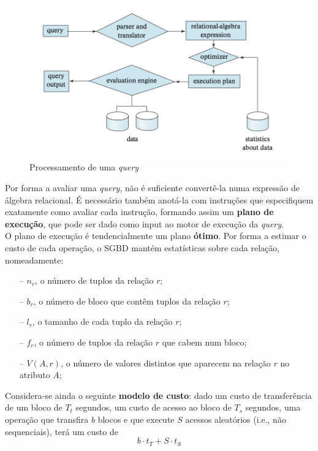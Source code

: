 \documentclass[oneside]{book}
\theoremstyle{definition}
\begin{document}
\begin{figure}[H]
    \centering
    \includegraphics[scale = 0.5]{cap1/arquitetura.png}
    \caption{Processamento de uma \textit{query}}
\end{figure}

Por forma a avaliar uma \textit{query}, não é suficiente convertê-la numa expressão de álgebra relacional. É necessário também anotá-la com instruções que especifiquem exatamente como avaliar cada instrução, formando assim um \textbf{plano de execução}, que pode ser dado como input ao motor de execução da \textit{query}.\\
O plano de execução é tendencialmente um plano \textbf{ótimo}. Por forma a estimar o custo de cada operação, o SGBD mantém estatísticas sobre cada relação, nomeadamente:

\begin{itemize}
    \itemsep0cm
    \item[--] $n_r$, o número de tuplos da relação $r$;
    \item[--] $b_r$, o número de bloco que contêm tuplos da relação $r$;
    \item[--] $l_r$, o tamanho de cada tuplo da relação $r$;
    \item[--] $f_r$, o número de tuplos da relação $r$ que cabem num bloco;
    \item[--] $V(A, r)$, o número de valores distintos que aparecem na relação $r$ no atributo $A$;
\end{itemize}

Considera-se ainda o seguinte \textbf{modelo de custo}: dado um custo de transferência de um bloco de $T_t$ segundos, um custo de acesso ao bloco de $T_s$ segundos, uma operação que transfira $b$ blocos e que execute $S$ acessos aleatórios (i.e., não sequenciais), terá um custo de 
\[
    b \cdot t_T + S \cdot t_S
\]
\end{document}
